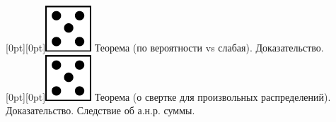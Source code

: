 \documentclass[10pt]{article}
\begin{document}
\raisebox{-1pt}[0pt][0pt]{\includegraphics[width=0.02\linewidth]{5.png}} Теорема (по вероятности vs слабая). Доказательство. \\  

\raisebox{-1pt}[0pt][0pt]{\includegraphics[width=0.02\linewidth]{5.png}} Теорема (о свертке для произвольных распределений). Доказательство. Следствие об а.н.р. суммы. \\ 
\end{document}
